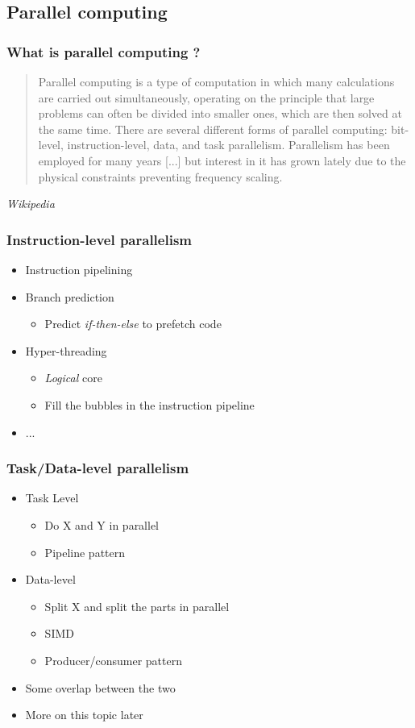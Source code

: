 \subsection{Parallel computing}

\begin{frame}
  \frametitle{What is parallel computing ?}

  \begin{quotation}
    Parallel computing is a type of computation in which many calculations are carried out simultaneously, operating on the principle that large problems can often be divided into smaller ones, which are then solved at the same time.
    There are several different forms of parallel computing: bit-level, instruction-level, data, and task parallelism.
    Parallelism has been employed for many years [...] but interest in it has grown lately due to the physical constraints preventing frequency scaling.
  \end{quotation}
  \emph{Wikipedia}
\end{frame}

\begin{frame}
  \frametitle{Instruction-level parallelism}
  \begin{itemize}
  \item Instruction pipelining
  \item Branch prediction
    \begin{itemize}
    \item Predict \emph{if-then-else} to prefetch code
    \end{itemize}
  \item Hyper-threading
    \begin{itemize}
    \item \emph{Logical} core
    \item Fill the bubbles in the instruction pipeline
    \end{itemize}
  \item ...
  \end{itemize}
\end{frame}

\begin{frame}
  \frametitle{Task/Data-level parallelism}
  \begin{itemize}
  \item Task Level
    \begin{itemize}
    \item Do X and Y in parallel
    \item Pipeline pattern
    \end{itemize}
  \item Data-level
    \begin{itemize}
    \item Split X and split the parts in parallel
    \item SIMD
    \item Producer/consumer pattern
    \end{itemize}
  \item Some overlap between the two
  \item More on this topic later
  \end{itemize}
\end{frame}


